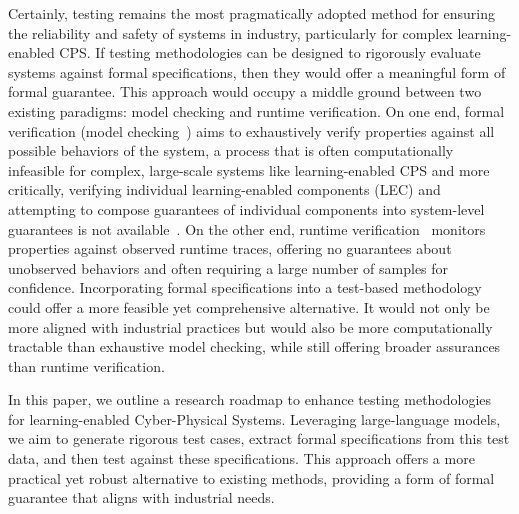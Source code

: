 Certainly, testing remains the most pragmatically adopted method for ensuring the reliability and safety of systems in industry, particularly for complex learning-enabled CPS. If testing methodologies can be designed to rigorously evaluate systems against formal specifications, then they would offer a meaningful form of formal guarantee. This approach would occupy a middle ground between two existing paradigms: model checking and runtime verification. On one end, formal verification (model checking~\cite{kochdumper2023fully}) aims to exhaustively verify properties against all possible behaviors of the system, a process that is often computationally infeasible for complex, large-scale systems like learning-enabled CPS and  more critically, verifying individual learning-enabled components (LEC) and attempting
to compose guarantees of individual components
into system-level guarantees is not available~\cite{seshia2017compositional}. On the other end, runtime verification~\cite{zapridou2020runtime} monitors properties against observed runtime traces, offering no guarantees about unobserved behaviors and often requiring a large number of samples for confidence. Incorporating formal specifications into a test-based methodology could offer a more feasible yet comprehensive alternative. It would not only be more aligned with industrial practices but would also be more computationally tractable than exhaustive model checking, while still offering broader assurances than runtime verification.

In this paper, we outline a research roadmap to enhance testing methodologies for learning-enabled Cyber-Physical Systems. Leveraging large-language models, we aim to generate rigorous test cases, extract formal specifications from this test data, and then test against these specifications. This approach offers a more practical yet robust alternative to existing methods, providing a form of formal guarantee that aligns with industrial needs.




